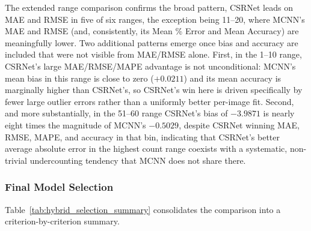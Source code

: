 The extended range comparison confirms the broad pattern, CSRNet leads on MAE and RMSE in five of six ranges, the exception being 11--20, where MCNN's MAE and RMSE (and, consistently, its Mean \% Error and Mean Accuracy) are meaningfully lower. Two additional patterns emerge once bias and accuracy are included that were not visible from MAE/RMSE alone. First, in the 1--10 range, CSRNet's large MAE/RMSE/MAPE advantage is not unconditional: MCNN's mean bias in this range is close to zero ($+0.0211$) and its mean accuracy is marginally higher than CSRNet's, so CSRNet's win here is driven specifically by fewer large outlier errors rather than a uniformly better per-image fit. Second, and more substantially, in the 51--60 range CSRNet's bias of $-3.9871$ is nearly eight times the magnitude of MCNN's $-0.5029$, despite CSRNet winning MAE, RMSE, MAPE, and accuracy in that bin, indicating that CSRNet's better average absolute error in the highest count range coexists with a systematic, non-trivial undercounting tendency that MCNN does not share there.

\subsubsection{Final Model Selection}

Table~\ref{tab:hybrid_selection_summary} consolidates the comparison into a criterion-by-criterion summary.

